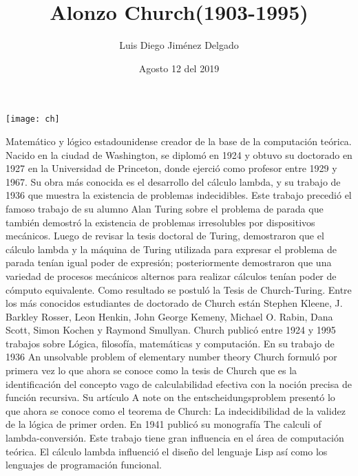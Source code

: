\documentclass[12pt]{article}
\title{Alonzo Church(1903-1995)}
\author{Luis Diego Jiménez Delgado}
\date{Agosto 12 del 2019}
\begin{document}
\maketitle

\begin{center}
\texttt{[image: ch]}
\end{center}
Matemático y lógico estadounidense creador de la base de la computación teórica. Nacido en la ciudad de Washington, se diplomó en 1924 y obtuvo su doctorado en 1927 en la Universidad de Princeton, donde ejerció como profesor entre 1929 y 1967.
Su obra más conocida es el desarrollo del cálculo lambda, y su trabajo de 1936 que muestra la existencia de problemas indecidibles. Este trabajo precedió el famoso trabajo de su alumno Alan Turing sobre el problema de parada que también demostró la existencia de problemas irresolubles por dispositivos mecánicos. Luego de revisar la tesis doctoral de Turing, demostraron que el cálculo lambda y la máquina de Turing utilizada para expresar el problema de parada tenían igual poder de expresión; posteriormente demostraron que una variedad de procesos mecánicos alternos para realizar cálculos tenían poder de cómputo equivalente. Como resultado se postuló la Tesis de Church-Turing.
Entre los más conocidos estudiantes de doctorado de Church están Stephen Kleene, J. Barkley Rosser, Leon Henkin, John George Kemeny, Michael O. Rabin, Dana Scott, Simon Kochen y Raymond Smullyan.
Church publicó entre 1924 y 1995 trabajos sobre Lógica, filosofía, matemáticas y computación. En su trabajo de 1936 An unsolvable problem of elementary number theory Church formuló por primera vez lo que ahora se conoce como la tesis de Church que es la identificación del concepto vago de calculabilidad efectiva con la noción precisa de función recursiva. Su artículo A note on the entscheidungsproblem presentó lo que ahora se conoce como el teorema de Church: La indecidibilidad de la validez de la lógica de primer orden. En 1941 publicó su monografía The calculi of lambda-conversión. Este trabajo tiene gran influencia en el área de computación teórica.
El cálculo lambda influenció el diseño del lenguaje Lisp así como los lenguajes de programación funcional.
\end{document}
